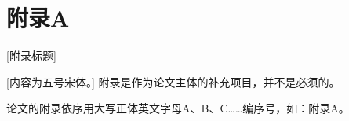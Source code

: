 \chapter{附录A}
\begin{center}
	{\heiti {} [附录标题]}
\end{center}

[内容为五号宋体。] 附录是作为论文主体的补充项目，并不是必须的。

论文的附录依序用大写正体英文字母A、B、C……编序号，如：附录A。


